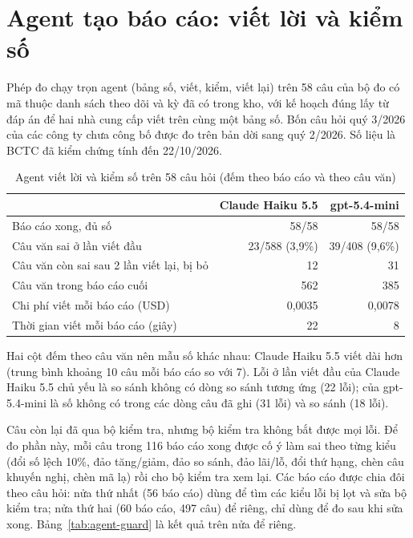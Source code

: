 \documentclass[12pt,a4paper]{report}
\begin{document}
\section{Agent tạo báo cáo: viết lời và kiểm số}\label{sec:evalagentviet}
Phép đo chạy trọn agent (bảng số, viết, kiểm, viết lại) trên 58 câu của bộ đo có mã thuộc danh sách theo dõi và kỳ đã có
trong kho, với kế hoạch đúng lấy từ đáp án để hai nhà cung cấp viết trên cùng một bảng số. Bốn câu hỏi quý 3/2026 của các
công ty chưa công bố được đo trên bản dời sang quý 2/2026. Số liệu là BCTC đã kiểm chứng tính đến 22/10/2026.

\begin{table}[H]
\centering\small
\caption{Agent viết lời và kiểm số trên 58 câu hỏi (đếm theo báo cáo và theo câu văn)}\label{tab:agent-write}
\begin{tabularx}{\linewidth}{@{}Xrr@{}}
\toprule
& \textbf{Claude Haiku 5.5} & \textbf{gpt-5.4-mini} \\ \midrule
Báo cáo xong, đủ số & 58/58 & 58/58 \\
Câu văn sai ở lần viết đầu & 23/588 (3,9\%) & 39/408 (9,6\%) \\
Câu văn còn sai sau 2 lần viết lại, bị bỏ & 12 & 31 \\
Câu văn trong báo cáo cuối & 562 & 385 \\
Chi phí viết mỗi báo cáo (USD) & 0,0035 & 0,0078 \\
Thời gian viết mỗi báo cáo (giây) & 22 & 8 \\
\bottomrule
\end{tabularx}
\end{table}

Hai cột đếm theo câu văn nên mẫu số khác nhau: Claude Haiku 5.5 viết dài hơn (trung bình khoảng 10 câu mỗi báo cáo so với
7). Lỗi ở lần viết đầu của Claude Haiku 5.5 chủ yếu là so sánh không có dòng so sánh tương ứng (22 lỗi); của gpt-5.4-mini là
số không có trong các dòng câu đã ghi (31 lỗi) và so sánh (18 lỗi).

Câu còn lại đã qua bộ kiểm tra, nhưng bộ kiểm tra không bắt được mọi lỗi. Để đo phần này, mỗi câu trong 116 báo cáo xong
được cố ý làm sai theo từng kiểu (đổi số lệch 10\%, đảo tăng/giảm, đảo so sánh, đảo lãi/lỗ, đổi thứ hạng, chèn câu khuyến
nghị, chèn mã lạ) rồi cho bộ kiểm tra xem lại. Các báo cáo được chia đôi theo câu hỏi: nửa thứ nhất (56 báo cáo) dùng để tìm
các kiểu lỗi bị lọt và sửa bộ kiểm tra; nửa thứ hai (60 báo cáo, 497 câu) để riêng, chỉ dùng để đo sau khi sửa xong.
Bảng~\ref{tab:agent-guard} là kết quả trên nửa để riêng.
\end{document}
